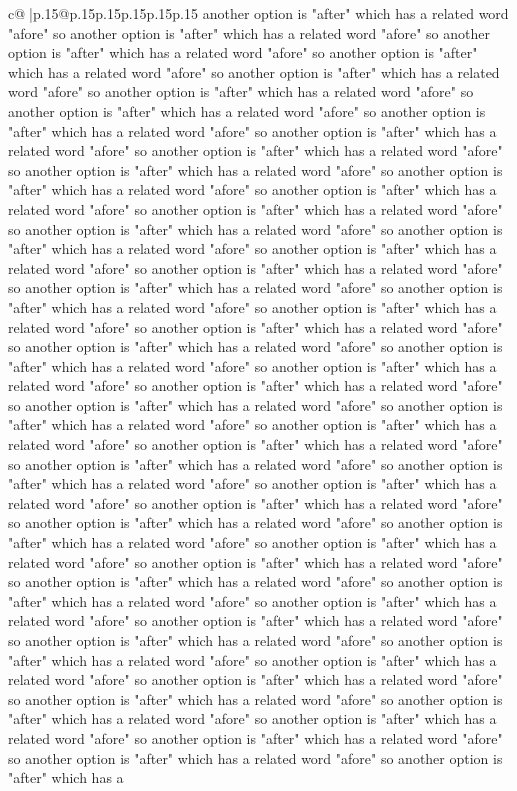 \documentclass{article}
\begin{document}
{\begin{supertabular}{c@{$\;$}|p{.15\linewidth}@{}p{.15\linewidth}p{.15\linewidth}p{.15\linewidth}p{.15\linewidth}p{.15\linewidth}}
{{{another option is "after" which has a related word "afore" so another option is "after" which has a related word "afore" so another option is "after" which has a related word "afore" so another option is "after" which has a related word "afore" so another option is "after" which has a related word "afore" so another option is "after" which has a related word "afore" so another option is "after" which has a related word "afore" so another option is "after" which has a related word "afore" so another option is "after" which has a related word "afore" so another option is "after" which has a related word "afore" so another option is "after" which has a related word "afore" so another option is "after" which has a related word "afore" so another option is "after" which has a related word "afore" so another option is "after" which has a related word "afore" so another option is "after" which has a related word "afore" so another option is "after" which has a related word "afore" so another option is "after" which has a related word "afore" so another option is "after" which has a related word "afore" so another option is "after" which has a related word "afore" so another option is "after" which has a related word "afore" so another option is "after" which has a related word "afore" so another option is "after" which has a related word "afore" so another option is "after" which has a related word "afore" so another option is "after" which has a related word "afore" so another option is "after" which has a related word "afore" so another option is "after" which has a related word "afore" so another option is "after" which has a related word "afore" so another option is "after" which has a related word "afore" so another option is "after" which has a related word "afore" so another option is "after" which has a related word "afore" so another option is "after" which has a related word "afore" so another option is "after" which has a related word "afore" so another option is "after" which has a related word "afore" so another option is "after" which has a related word "afore" so another option is "after" which has a related word "afore" so another option is "after" which has a related word "afore" so another option is "after" which has a related word "afore" so another option is "after" which has a related word "afore" so another option is "after" which has a related word "afore" so another option is "after" which has a related word "afore" so another option is "after" which has a related word "afore" so another option is "after" which has a related word "afore" so another option is "after" which has a related word "afore" so another option is "after" which has a related word "afore" so another option is "after" which has a related word "afore" so another option is "after" which has a related word "afore" so another option is "after" which has a related word "afore" so another option is "after" which has a related word "afore" so another option is "after" which has a related word "afore" so another option is "after" which has a related word "afore" so another option is "after" which has a related word "afore" so another option is "after" which has a }}}
\end{supertabular}}
\end{document}
